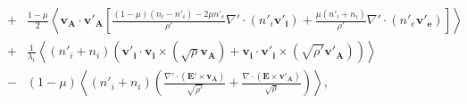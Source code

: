 \begin{eqnarray}
  &+& \frac{1-\mu}{2}\left< \boldsymbol{v_A} \cdot \boldsymbol{v'_{A}} \left[\frac{\left(1-\mu\right)\left(n_i - n'_i\right) -2 \mu n'_e  }{\rho'}\nabla' \cdot \left(n'_i \boldsymbol{v'_i}\right)+ \frac{ \mu \left(n'_i + n_i\right) }{\rho'}\nabla' \cdot \left(n'_e \boldsymbol{v'_e}\right)\right]  \right>\nonumber \\ %
  &+& \frac{1}{\lambda_i} \left<\left(n'_i + n_i\right)\left(  \boldsymbol{v'_i} \cdot \boldsymbol{v_i} \times \left(\sqrt{\rho}\boldsymbol{v_A}\right) +  \boldsymbol{v_i} \cdot \boldsymbol{v'_i} \times \left( \sqrt{\rho'}\boldsymbol{v'_A}\right)\right) \right>\nonumber\\ %
  &-& \left(1-\mu\right)\left< \left(n'_i + n_i\right)  \left( \frac{ \nabla' \cdot \left(\boldsymbol{E'}\times \boldsymbol{v_A}\right) }{\sqrt{\rho'}} + \frac{\nabla \cdot \left(  \boldsymbol{E}\times \boldsymbol{v'_A} \right) }{\sqrt{\rho}}\right)\right> ,%
 \end{eqnarray}   %

